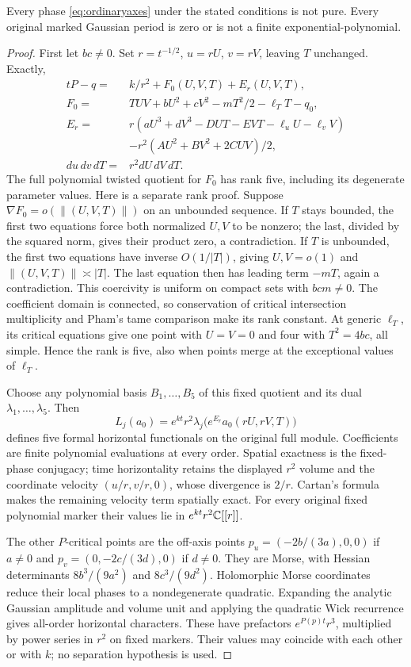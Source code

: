 \begin{proposition}\label{prop:axisexclusion}
Every phase \eqref{eq:ordinaryaxes} under the stated conditions
is not pure. Every original marked Gaussian period is zero or
is not a finite exponential-polynomial.
\end{proposition}
\begin{proof}
First let $bc\ne0$. Set $r=t^{-1/2}$, $u=rU$, $v=rV$, leaving
$T$ unchanged. Exactly,
\begin{align*}
 tP-q={}&k/r^2+F_0(U,V,T)+E_r(U,V,T),\\
 F_0={}&TUV+bU^2+cV^2-mT^2/2-\ell_TT-q_0,\\
 E_r={}&r(aU^3+dV^3-DUT-EVT-\ell_uU-\ell_vV)\\
       &-r^2(AU^2+BV^2+2CUV)/2,\\
 du\,dv\,dT={}&r^2dU\,dV\,dT.
\end{align*}
The full polynomial twisted quotient for $F_0$ has rank five,
including its degenerate parameter values. Here is a separate rank
proof. Suppose $\nabla F_0=o(\|(U,V,T)\|)$ on an unbounded
sequence. If $T$ stays bounded, the first two equations force
both normalized $U,V$ to be nonzero; the last, divided by the
squared norm, gives their product zero, a contradiction. If
$T$ is unbounded, the first two equations have inverse
$O(1/|T|)$, giving $U,V=o(1)$ and $\|(U,V,T)\|\asymp|T|$.
The last equation then has leading term $-mT$, again a
contradiction. This coercivity is uniform on compact sets with
$bcm\ne0$. The coefficient domain is connected, so conservation
of critical intersection multiplicity and Pham's tame comparison
make its rank constant. At generic $\ell_T$, its critical
equations give one point with $U=V=0$ and four with
$T^2=4bc$, all simple. Hence the rank is five, also when points
merge at the exceptional values of $\ell_T$.

Choose any polynomial basis $B_1,\ldots,B_5$ of this fixed
quotient and its dual $\lambda_1,\ldots,\lambda_5$. Then
\[
 L_j(a_0)=e^{kt}r^2\lambda_j\bigl(e^{E_r}a_0(rU,rV,T)\bigr)
\]
defines five formal horizontal functionals on the original full
module. Coefficients are finite polynomial evaluations at every
order. Spatial exactness is the fixed-phase conjugacy; time
horizontality retains the displayed $r^2$ volume and the
coordinate velocity $(u/r,v/r,0)$, whose divergence is $2/r$.
Cartan's formula makes the remaining velocity term spatially exact.
For every original fixed polynomial marker their values lie in
$e^{kt}r^2\mathbb C[[r]]$.

The other $P$-critical points are the off-axis points
$p_u=(-2b/(3a),0,0)$ if $a\ne0$ and
$p_v=(0,-2c/(3d),0)$ if $d\ne0$. They are Morse, with Hessian
determinants $8b^3/(9a^2)$ and $8c^3/(9d^2)$. Holomorphic Morse coordinates reduce their local phases to a
nondegenerate quadratic. Expanding the analytic Gaussian amplitude
and volume unit and applying the quadratic Wick recurrence gives
all-order horizontal characters. These have prefactors $e^{P(p)t}r^3$, multiplied by power series in
$r^2$ on fixed markers. Their values may coincide with each
other or with $k$; no separation hypothesis is used.


\end{proof}
